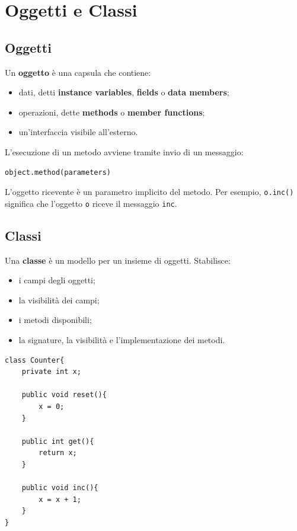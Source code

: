 \documentclass{article}
\begin{document}
\section{Oggetti e Classi}

\subsection{Oggetti}

Un \textbf{oggetto} è una capsula che contiene:
\begin{itemize}
  \item dati, detti \textbf{instance variables}, \textbf{fields} o \textbf{data members};
  \item operazioni, dette \textbf{methods} o \textbf{member functions};
  \item un'interfaccia visibile all'esterno.
\end{itemize}

L'esecuzione di un metodo avviene tramite invio di un messaggio:

\begin{lstlisting}
object.method(parameters)
\end{lstlisting}

L'oggetto ricevente è un parametro implicito del metodo. Per esempio, \texttt{o.inc()} significa che l'oggetto \texttt{o} riceve il messaggio \texttt{inc}.

\subsection{Classi}

Una \textbf{classe} è un modello per un insieme di oggetti. Stabilisce:
\begin{itemize}
  \item i campi degli oggetti;
  \item la visibilità dei campi;
  \item i metodi disponibili;
  \item la signature, la visibilità e l'implementazione dei metodi.
\end{itemize}

\begin{lstlisting}
class Counter{
    private int x;

    public void reset(){
        x = 0;
    }

    public int get(){
        return x;
    }

    public void inc(){
        x = x + 1;
    }
}
\end{lstlisting}
\end{document}
